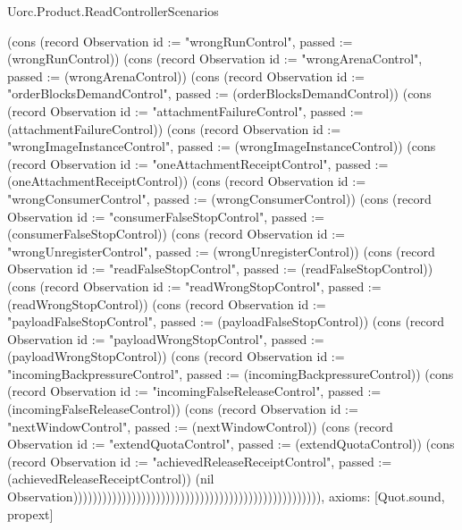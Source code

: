 \begin{lexlean}{Uorc.Product.ReadControllerScenarios}
\begin{semanticmodule}
{(cons (record Observation {id := "wrongRunControl", passed := (wrongRunControl)}) (cons (record Observation {id := "wrongArenaControl", passed := (wrongArenaControl)}) (cons (record Observation {id := "orderBlocksDemandControl", passed := (orderBlocksDemandControl)}) (cons (record Observation {id := "attachmentFailureControl", passed := (attachmentFailureControl)}) (cons (record Observation {id := "wrongImageInstanceControl", passed := (wrongImageInstanceControl)}) (cons (record Observation {id := "oneAttachmentReceiptControl", passed := (oneAttachmentReceiptControl)}) (cons (record Observation {id := "wrongConsumerControl", passed := (wrongConsumerControl)}) (cons (record Observation {id := "consumerFalseStopControl", passed := (consumerFalseStopControl)}) (cons (record Observation {id := "wrongUnregisterControl", passed := (wrongUnregisterControl)}) (cons (record Observation {id := "readFalseStopControl", passed := (readFalseStopControl)}) (cons (record Observation {id := "readWrongStopControl", passed := (readWrongStopControl)}) (cons (record Observation {id := "payloadFalseStopControl", passed := (payloadFalseStopControl)}) (cons (record Observation {id := "payloadWrongStopControl", passed := (payloadWrongStopControl)}) (cons (record Observation {id := "incomingBackpressureControl", passed := (incomingBackpressureControl)}) (cons (record Observation {id := "incomingFalseReleaseControl", passed := (incomingFalseReleaseControl)}) (cons (record Observation {id := "nextWindowControl", passed := (nextWindowControl)}) (cons (record Observation {id := "extendQuotaControl", passed := (extendQuotaControl)}) (cons (record Observation {id := "achievedReleaseReceiptControl", passed := (achievedReleaseReceiptControl)}) (nil Observation))))))))))))))))))))))))))))))))))))))))))))))))))),
  axioms: [Quot.sound, propext]
}
\end{semanticmodule}
\end{lexlean}

